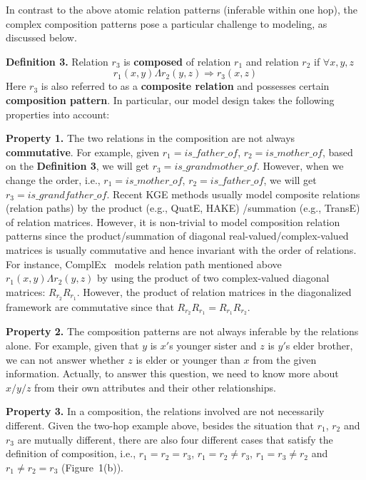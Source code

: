 \documentclass[11pt]{article}
\begin{document}
In contrast to the above atomic relation patterns (inferable within one hop), the complex composition patterns pose a particular challenge to modeling, as discussed below.

\textbf{Definition 3.} Relation \(r_3\) is \textbf{composed} of relation \(r_1\) and relation \(r_2\) if \(\forall x, y, z\)
\begin{equation}
r_1(x, y)  \Lambda  r_2(y, z) \Rightarrow r_3(x, z) 
\label{composite_def}
\end{equation}
Here \(r_3\) is also referred to as a \textbf{composite relation} and possesses certain \textbf{composition pattern}. 
In particular, our model design takes the following properties into account:

\textbf{Property 1.} The two relations in the composition are not always \textbf{commutative}. For example, given \(r_1=is\_father\_of\), \(r_2=is\_mother\_of\), based on the \textbf{Definition 3}, we will get \(r_3=is\_grandmother\_of\). However, when we change the order, i.e., \(r_1=is\_mother\_of\), \(r_2=is\_father\_of\), we will get \(r_3=is\_grandfather\_of\). Recent KGE methods usually model composite relations (relation paths) by the product (e.g., QuatE, HAKE) /summation (e.g., TransE) of relation matrices. However, it is non-trivial to model composition relation patterns since the product/summation of diagonal real-valued/complex-valued matrices is usually commutative and hence invariant with the order of relations. For instance, ComplEx~\cite{trouillon2016complex} models relation path mentioned above \(r_1(x,y) \Lambda r_2(y, z)\) by using the product of two complex-valued diagonal matrices: \(R_{r_2}R_{r_1}\). However, the product of relation matrices in the diagonalized framework are commutative since that \(R_{r_2}R_{r_1} = R_{r_1}R_{r_2}\).

\textbf{Property 2.} The composition patterns are not always inferable by the relations alone. For example, given that \(y\) is \(x'\)s younger sister and \(z\) is \(y'\)s elder brother, we can not answer whether \(z\) is elder or younger than \(x\) from the given information. Actually, to answer this question, we need to know more about \(x/y/z\) from their own attributes and their other relationships.

\textbf{Property 3.} In a composition, the relations involved are not necessarily different. Given the two-hop example above, besides the situation that \(r_1\), \(r_2\) and \(r_3 \) are mutually different, there are also four different cases that satisfy the definition of composition, i.e., \(r_1 = r_2 = r_3 \), \(r_1 = r_2 \neq r_3 \), \(r_1 = r_3 \neq r_2 \) and \(r_1 \neq r_2 = r_3 \) (Figure~1(b)).
\end{document}
